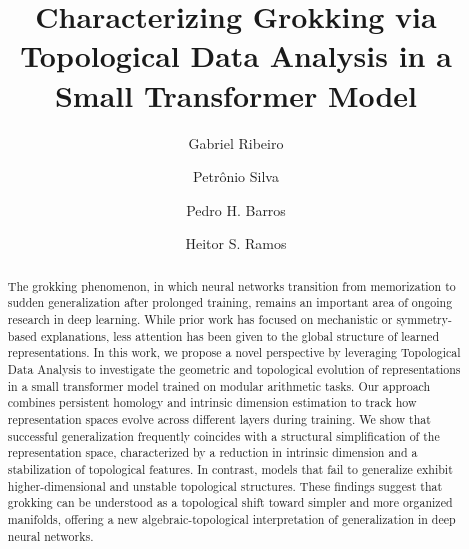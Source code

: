 \documentclass[runningheads]{llncs}
\begin{document}
\title{Characterizing Grokking via Topological Data Analysis in a Small Transformer Model}

\author{Gabriel Ribeiro \and
Petr\^onio Silva \and
Pedro H. Barros \and
Heitor S. Ramos}



\maketitle              

\begin{abstract}
The grokking phenomenon, in which neural networks transition from memorization to sudden generalization after prolonged training, remains an important area of ongoing research in deep learning. While prior work has focused on mechanistic or symmetry-based explanations, less attention has been given to the global structure of learned representations. In this work, we propose a novel perspective by leveraging Topological Data Analysis to investigate the geometric and topological evolution of representations in a small transformer model trained on modular arithmetic tasks. Our approach combines persistent homology and intrinsic dimension estimation to track how representation spaces evolve across different layers during training. We show that successful generalization frequently coincides with a structural simplification of the representation space, characterized by a reduction in intrinsic dimension and a stabilization of topological features. In contrast, models that fail to generalize exhibit higher-dimensional and unstable topological structures. These findings suggest that grokking can be understood as a topological shift toward simpler and more organized manifolds, offering a new algebraic-topological interpretation of generalization in deep neural networks.
\end{abstract}






\end{document}
